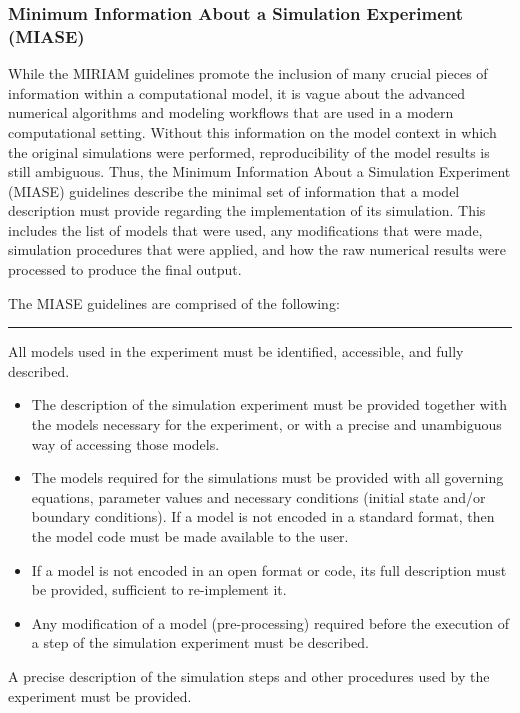 \documentclass[]{article}
\begin{document}
\subsubsection{Minimum Information About a Simulation Experiment
(MIASE)}

While the MIRIAM guidelines promote the inclusion of many crucial pieces
of information within a computational model, it is vague about the
advanced numerical algorithms and modeling workflows that are used in a
modern computational setting. Without this information on the model
context in which the original simulations were performed,
reproducibility of the model results is still ambiguous. Thus, the
Minimum Information About a Simulation Experiment (MIASE) guidelines
\autocite{waltemath2011minimum} describe the minimal set of information
that a model description must provide regarding the implementation of
its simulation. This includes the list of models that were used, any
modifications that were made, simulation procedures that were applied,
and how the raw numerical results were processed to produce the final
output.

The MIASE guidelines are comprised of the following:

\begin{center}\rule{3in}{0.4pt}\end{center}

All models used in the experiment must be identified, accessible, and
fully described.

\begin{itemize}
\item
  The description of the simulation experiment must be provided together
  with the models necessary for the experiment, or with a precise and
  unambiguous way of accessing those models.
\item
  The models required for the simulations must be provided with all
  governing equations, parameter values and necessary conditions
  (initial state and/or boundary conditions). If a model is not encoded
  in a standard format, then the model code must be made available to
  the user.
\item
  If a model is not encoded in an open format or code, its full
  description must be provided, sufficient to re-implement it.
\item
  Any modification of a model (pre-processing) required before the
  execution of a step of the simulation experiment must be described.
\end{itemize}
A precise description of the simulation steps and other procedures used
by the experiment must be provided.
\end{document}
